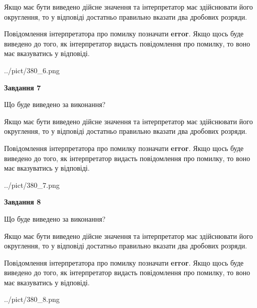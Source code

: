 \documentclass[12pt, ukrainian]{article}
\begin{document}
{\begin {Large}
Якщо має бути виведено дійсне значення та інтерпретатор має здійснювати його округлення, 
то у відповіді достатньо правильно вказати два дробових розряди.

Повідомлення інтерпретатора про помилку позначати \textbf{error}.
Якщо щось буде виведено до того, як інтерпретатор видасть повідомлення про помилку, 
то воно має вказуватись у відповіді. \par

\begin{center}
	{../pict/380_6.png}
\end{center}
\newpage

{\begin {center}\textbf{Завдання 7}\end {center}}\par
Що буде виведено за виконання? \par

Якщо має бути виведено дійсне значення та інтерпретатор має здійснювати його округлення, 
то у відповіді достатньо правильно вказати два дробових розряди.

Повідомлення інтерпретатора про помилку позначати \textbf{error}.
Якщо щось буде виведено до того, як інтерпретатор видасть повідомлення про помилку, 
то воно має вказуватись у відповіді. \par

\begin{center}
	{../pict/380_7.png}
\end{center}
\newpage

{\begin {center}\textbf{Завдання 8}\end {center}}\par
Що буде виведено за виконання? \par

Якщо має бути виведено дійсне значення та інтерпретатор має здійснювати його округлення, 
то у відповіді достатньо правильно вказати два дробових розряди.

Повідомлення інтерпретатора про помилку позначати \textbf{error}.
Якщо щось буде виведено до того, як інтерпретатор видасть повідомлення про помилку, 
то воно має вказуватись у відповіді. \par

\begin{center}
	{../pict/380_8.png}
\end{center}
\newpage


\end{Large}}
\end{document}
